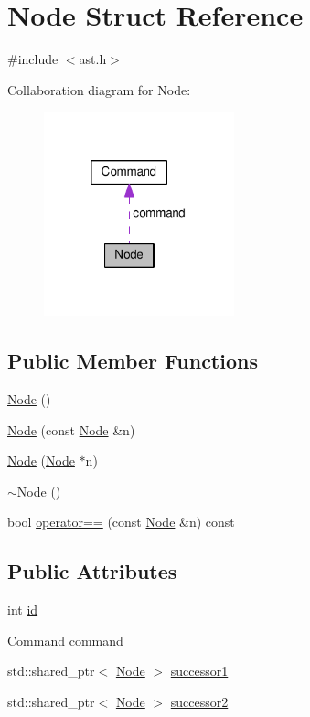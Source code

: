 \hypertarget{structNode}{\section{Node Struct Reference}
\label{structNode}
}


{\ttfamily \#include $<$ast.\-h$>$}



Collaboration diagram for Node\-:
\nopagebreak
\begin{figure}[H]
\begin{center}
\leavevmode
\includegraphics[width=156pt]{structNode__coll__graph}
\end{center}
\end{figure}
\subsection*{Public Member Functions}
\begin{DoxyCompactItemize}
\item 
\hyperlink{structNode_ad7a34779cad45d997bfd6d3d8043c75f}{Node} ()
\item 
\hyperlink{structNode_a277918b68827f6ffd8150f450b0c12c3}{Node} (const \hyperlink{structNode}{Node} \&n)
\item 
\hyperlink{structNode_a49671be091a3b75f20a4cdaf114dcdef}{Node} (\hyperlink{structNode}{Node} $\ast$n)
\item 
\hyperlink{structNode_aa0840c3cb5c7159be6d992adecd2097c}{$\sim$\-Node} ()
\item 
bool \hyperlink{structNode_a34785dbb41a8eed1a1871863300ab180}{operator==} (const \hyperlink{structNode}{Node} \&n) const 
\end{DoxyCompactItemize}
\subsection*{Public Attributes}
\begin{DoxyCompactItemize}
\item 
int \hyperlink{structNode_a59a543130a10c95f1e8642cf8c5645e8}{id}
\item 
\hyperlink{structCommand}{Command} \hyperlink{structNode_a77877b9758bdbfe6de9c1a9cafc76bd4}{command}
\item 
std\-::shared\-\_\-ptr$<$ \hyperlink{structNode}{Node} $>$ \hyperlink{structNode_ab452a3c22bdb42908e040e6f4fe4b097}{successor1}
\item 
std\-::shared\-\_\-ptr$<$ \hyperlink{structNode}{Node} $>$ \hyperlink{structNode_a1b5557700bd2ad4b58800bfa15999323}{successor2}
\end{DoxyCompactItemize}


